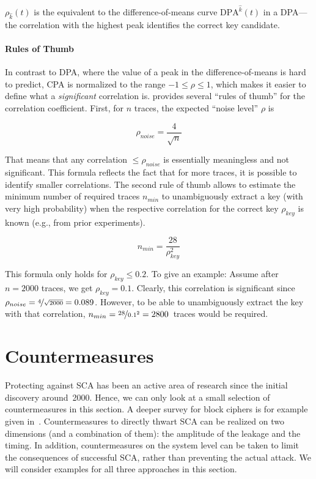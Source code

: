 $\rho_{\hat{k}}\left(t\right)$ is the equivalent to the difference-of-means curve $\mbox{DPA}^{\hat{k}}\left(t\right)$ in a \ac{DPA}---the correlation with the highest peak identifies the correct key candidate.

\paragraph{Rules of Thumb} 
In contrast to \ac{DPA}, where the value of a peak in the difference-of-means is hard to predict, \ac{CPA} is normalized to the range $-1 \leq \rho \leq 1$, which makes it easier to define what a \emph{significant} correlation is. \cite{MangardOP_DPABook_07} provides several ``rules of thumb'' for the correlation coefficient.
First, for $n$ traces, the expected ``noise level'' $\rho$ is

$$
\rho_{noise} = \frac{4}{\sqrt{n}}
$$

That means that any correlation $\leq \rho_{noise}$ is essentially meaningless and not significant. This formula reflects the fact that for more traces, it is possible to identify smaller correlations. The second rule of thumb allows to estimate the minimum number of required traces $n_{min}$ to unambiguously extract a key (with very high probability) when the respective correlation for the correct key $\rho_{key}$ is known (e.g., from prior experiments). 

$$
n_{min} = \frac{28}{\rho_{key}^2}
$$

This formula only holds for $\rho_{key} \leq 0.2$. To give an example: Assume after $n = 2000$ traces, we get $\rho_{key} = 0.1$. Clearly, this correlation is significant since $\rho_{noise} = \nicefrac{4}{\sqrt{2000}} = 0.089$. However, to be able to unambiguously extract the key with that correlation, $n_{min} = \nicefrac{28}{0.1^2} = 2800$~traces would be required.

\section{Countermeasures}
Protecting against \ac{SCA} has been an active area of research since the initial discovery around~2000. Hence, we can only look at a small selection of countermeasures in this section. A deeper survey for block ciphers is for example given in~\cite{prouff_ches2013}. Countermeasures to directly thwart \ac{SCA} can be realized on two dimensions (and a combination of them): the amplitude of the leakage and the timing. In addition, countermeasures on the system level can be taken to limit the consequences of successful \ac{SCA}, rather than preventing the actual attack. We will consider examples for all three approaches in this section.

